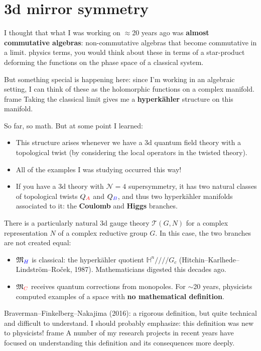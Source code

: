 \documentclass[presentation]{beamer}
\newenvironment{block}
\newenvironment{frame}
\theoremstyle{remark}
\begin{document}
\section{3d mirror symmetry}
\begin{frame}
I thought that what I was working on $\approx$20 years ago was {\bf almost commutative algebras}: non-commutative algebras that become commutative in a limit.  
\begin{block}{}
  In physics terms, you would think about these in terms of a star-product deforming the functions on the phase space of a classical system.  \medskip

  But something special is happening here: since I'm working in an algebraic setting, I can think of these as the holomorphic functions on a complex manifold.  
\end{block}
Taking the classical limit gives me a {\bf hyperk\"ahler} structure on this manifold.  
\end{frame}
\begin{frame}
So far, so math.  But at some point I learned:
\begin{itemize}
  \item This structure arises whenever we have a 3d quantum field theory with a topological twist (by considering the local operators in the twisted theory).
  \item<2-> All of the examples I was studying occurred this way!
  \item<3-> If you have a 3d theory with $\mathcal{N}=4$ supersymmetry, it has two natural classes of topological twists $Q_{\color{red} A}$ and $Q_{\color{blue} B}$, and thus two hyperk\"ahler manifolds associated to it:   the {\bf \color{red} Coulomb}  and {\bf \color{blue} Higgs} branches.
\end{itemize}
\end{frame}
\begin{frame}
There is a particularly natural 3d gauge theory $\mathcal{T}(G,N)$ for a complex representation $N$ of a complex reductive group $G$.
In this case, the two branches are not created equal:
  \begin{itemize}
  \item $\mathfrak{M}_{\color{blue}H}$ is classical: the hyperk\"ahler quotient
    $\mathbb{H}^n/\!/\!/\!/G_c$ (Hitchin--Karlhede--Lindstr\"om--Ro\v
    cek, 1987).  Mathematicians digested this decades ago.
  \item $\mathfrak{M}_{\color{red}C}$ receives quantum corrections from monopoles.  For
    $\sim$20 years, physicists computed examples of a space with {\bf
      no mathematical definition}.
  \end{itemize}
  \begin{block}{}
    Braverman--Finkelberg--Nakajima (2016): a rigorous definition, but quite technical and difficult to understand.  I should probably emphasize: this definition was new to physicists!
  \end{block}
  A number of my research projects in recent years have focused on understanding this definition and its consequences more deeply.
  \end{frame}
\end{document}
